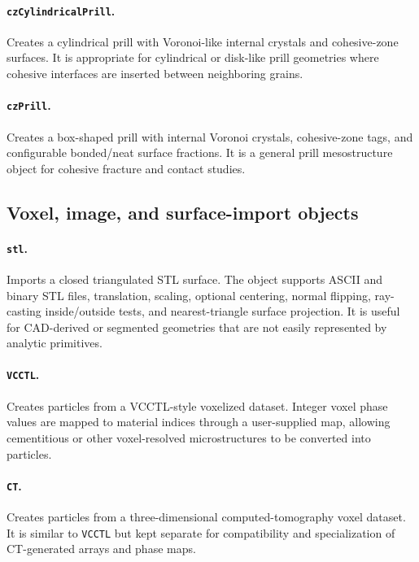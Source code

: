 \paragraph{\texttt{czCylindricalPrill}.}Creates a cylindrical prill with Voronoi-like internal crystals and cohesive-zone surfaces.  It is appropriate for cylindrical or disk-like prill geometries where cohesive interfaces are inserted between neighboring grains.

\paragraph{\texttt{czPrill}.}Creates a box-shaped prill with internal Voronoi crystals, cohesive-zone tags, and configurable bonded/neat surface fractions.  It is a general prill mesostructure object for cohesive fracture and contact studies.

\subsection{Voxel, image, and surface-import objects}

\paragraph{\texttt{stl}.}Imports a closed triangulated STL surface.  The object supports ASCII and binary STL files, translation, scaling, optional centering, normal flipping, ray-casting inside/outside tests, and nearest-triangle surface projection.  It is useful for CAD-derived or segmented geometries that are not easily represented by analytic primitives.

\paragraph{\texttt{VCCTL}.}Creates particles from a VCCTL-style voxelized dataset.  Integer voxel phase values are mapped to material indices through a user-supplied map, allowing cementitious or other voxel-resolved microstructures to be converted into particles.

\paragraph{\texttt{CT}.}Creates particles from a three-dimensional computed-tomography voxel dataset.  It is similar to \texttt{VCCTL} but kept separate for compatibility and specialization of CT-generated arrays and phase maps.


